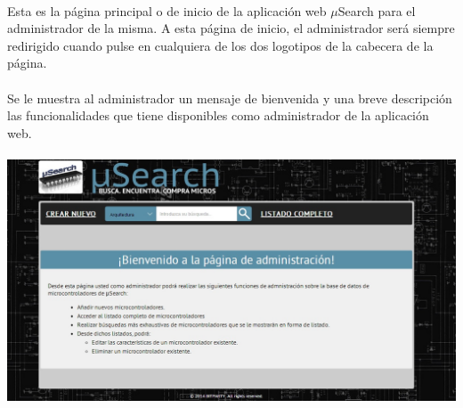 \paragraph{}Esta es la página principal o de inicio de la aplicación web $\mu$Search para el administrador de la misma. A esta página de inicio, el administrador será siempre redirigido cuando pulse en cualquiera de los dos logotipos de la cabecera de la página.

\paragraph{}Se le muestra al administrador un mensaje de bienvenida y una breve descripción las funcionalidades que tiene disponibles como administrador de la aplicación web.

\begin{center}
	\paragraph{}\includegraphics[scale=0.35]{img/principal_admin}\singlelinebreak
\end{center}

